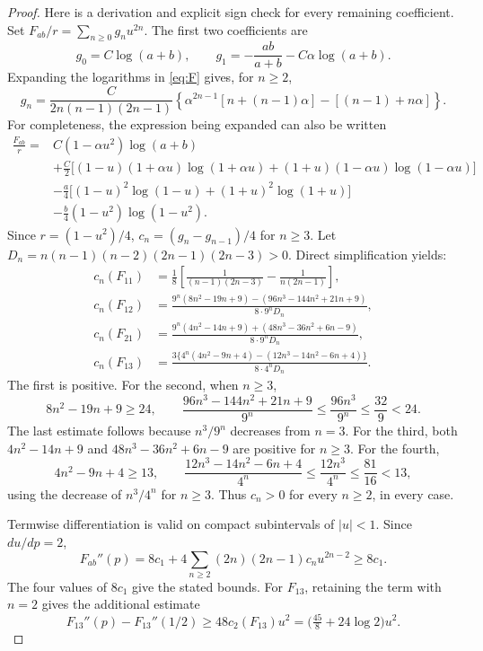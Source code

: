 \documentclass[11pt,a4paper]{article}
\begin{document}
\begin{proof}
Here is a derivation and explicit sign check for every remaining
coefficient. Set \(F_{ab}/r=\sum_{n\ge0}g_nu^{2n}\).
The first two coefficients are
\[
 g_0=C\log(a+b),\qquad
 g_1=-\frac{ab}{a+b}-C\alpha\log(a+b).
\]
Expanding the logarithms in \eqref{eq:F} gives, for \(n\ge2\),
\begin{equation}\label{eq:gn}
 g_n=\frac{C}{2n(n-1)(2n-1)}
 \left\{\alpha^{2n-1}[n+(n-1)\alpha]-[(n-1)+n\alpha]\right\}.
\end{equation}
For completeness, the expression being expanded can also be written
\begin{align*}
 \frac{F_{ab}}r={}&C(1-\alpha u^2)\log(a+b)\\
 &+\frac C2\bigl[(1-u)(1+\alpha u)\log(1+\alpha u)
               +(1+u)(1-\alpha u)\log(1-\alpha u)\bigr]\\
 &-\frac a4\bigl[(1-u)^2\log(1-u)+(1+u)^2\log(1+u)\bigr]\\
 &-\frac b4(1-u^2)\log(1-u^2).
\end{align*}
Since \(r=(1-u^2)/4\), \(c_n=(g_n-g_{n-1})/4\) for \(n\ge3\).
Let \(D_n=n(n-1)(n-2)(2n-1)(2n-3)>0\). Direct simplification yields:
\begin{align*}
 c_n(F_{11})&=\frac18\left[
 \frac1{(n-1)(2n-3)}-\frac1{n(2n-1)}\right],\\
 c_n(F_{12})&=
 \frac{9^n(8n^2-19n+9)-(96n^3-144n^2+21n+9)}
 {8\cdot9^nD_n},\\
 c_n(F_{21})&=
 \frac{9^n(4n^2-14n+9)+(48n^3-36n^2+6n-9)}
 {8\cdot9^nD_n},\\
 c_n(F_{13})&=
 \frac{3\{4^n(4n^2-9n+4)-(12n^3-14n^2-6n+4)\}}
 {8\cdot4^nD_n}.
\end{align*}
The first is positive. For the second, when \(n\ge3\),
\[
 8n^2-19n+9\ge24,\qquad
 \frac{96n^3-144n^2+21n+9}{9^n}
 \le\frac{96n^3}{9^n}\le\frac{32}{9}<24.
\]
The last estimate follows because \(n^3/9^n\) decreases from \(n=3\).
For the third, both \(4n^2-14n+9\) and
\(48n^3-36n^2+6n-9\) are positive for \(n\ge3\).
For the fourth,
\[
 4n^2-9n+4\ge13,\qquad
 \frac{12n^3-14n^2-6n+4}{4^n}
 \le\frac{12n^3}{4^n}\le\frac{81}{16}<13,
\]
using the decrease of \(n^3/4^n\) for \(n\ge3\).
Thus \(c_n>0\) for every \(n\ge2\), in every case.

Termwise differentiation is valid on compact subintervals of \(|u|<1\).
Since \(du/dp=2\),
\[
 F_{ab}''(p)
 =8c_1+4\sum_{n\ge2}(2n)(2n-1)c_nu^{2n-2}\ge8c_1.
\]
The four values of \(8c_1\) give the stated bounds. For \(F_{13}\),
retaining the term with \(n=2\) gives the additional estimate
\begin{equation}\label{eq:quartic}
 F_{13}''(p)-F_{13}''(1/2)\ge
 48c_2(F_{13})u^2=\bigl(\tfrac{45}8+24\log2\bigr)u^2.
\end{equation}
\end{proof}
\end{document}
